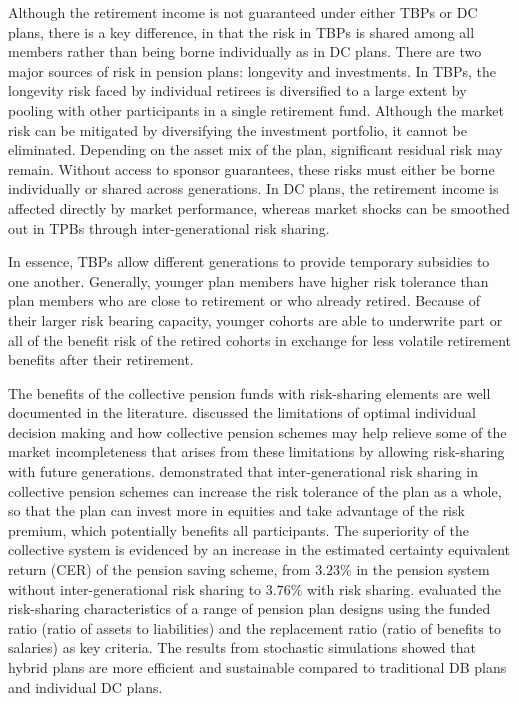 \documentclass{sfuthesis}
\numberwithin{equation}{chapter}
\begin{document}
	

		\justify
		Although the retirement income is not guaranteed under either TBPs or DC plans, there is a key difference, in that the risk in TBPs is shared among all members rather than being borne individually as in DC plans. There are two major sources of risk in pension plans: longevity and investments. In TBPs, the longevity risk faced by individual retirees is diversified to a large extent by pooling with other participants in a single retirement fund. Although the market risk can be mitigated by diversifying the investment portfolio, it cannot be eliminated. Depending on the asset mix of the plan, significant residual risk may remain. Without access to sponsor guarantees, these risks must either be borne individually or shared across generations. In DC plans, the retirement income is affected directly by market performance, whereas market shocks can be smoothed out in TPBs through inter-generational risk sharing.

	

		\justify
		In essence, TBPs allow different generations to provide temporary subsidies to one another. Generally, younger plan members have higher risk tolerance than plan members who are close to retirement or who already retired. Because of their larger risk bearing capacity, younger cohorts are able to underwrite part or all of the benefit risk of the retired cohorts in exchange for less volatile retirement benefits after their retirement.

	

		\justify
		The benefits of the collective pension funds with risk-sharing elements are well documented in the literature. \citet{Bovenberg2007} discussed the limitations of optimal individual decision making and how collective pension schemes may help relieve some of the market incompleteness that arises from these limitations by allowing risk-sharing with future generations. \citet{Gollier2008} demonstrated that inter-generational risk sharing in collective pension schemes can increase the risk tolerance of the plan as a whole, so that the plan can invest more in equities and take advantage of the risk premium, which potentially benefits all participants. The superiority of the collective system is evidenced by an increase in the estimated certainty equivalent return (CER) of the pension saving scheme, from $3.23\%$ in the pension system without inter-generational risk sharing to $3.76\%$ with risk sharing. \citet{Blommestein2009} evaluated the risk-sharing characteristics of a range of pension plan designs using the funded ratio (ratio of assets to liabilities) and the replacement ratio (ratio of benefits to salaries) as key criteria. The results from stochastic simulations showed that hybrid plans are more efficient and sustainable compared to traditional DB plans and individual DC plans. 
\end{document}
